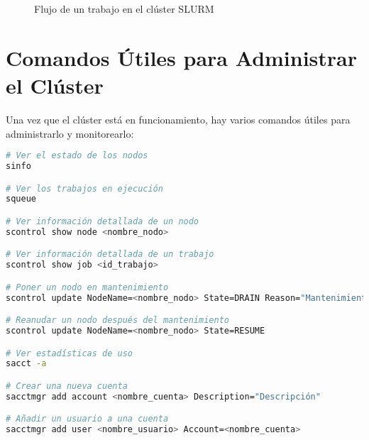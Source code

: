 \documentclass[12pt,a4paper]{article}
\begin{document}
\begin{figure}[h]
\centering
{}
\caption{Flujo de un trabajo en el clúster SLURM}
\end{figure}

\section{Comandos Útiles para Administrar el Clúster}

Una vez que el clúster está en funcionamiento, hay varios comandos útiles para administrarlo y monitorearlo:

\begin{lstlisting}[language=bash, caption=Comandos administrativos de SLURM]
# Ver el estado de los nodos
sinfo

# Ver los trabajos en ejecución
squeue

# Ver información detallada de un nodo
scontrol show node <nombre_nodo>

# Ver información detallada de un trabajo
scontrol show job <id_trabajo>

# Poner un nodo en mantenimiento
scontrol update NodeName=<nombre_nodo> State=DRAIN Reason="Mantenimiento"

# Reanudar un nodo después del mantenimiento
scontrol update NodeName=<nombre_nodo> State=RESUME

# Ver estadísticas de uso
sacct -a

# Crear una nueva cuenta
sacctmgr add account <nombre_cuenta> Description="Descripción"

# Añadir un usuario a una cuenta
sacctmgr add user <nombre_usuario> Account=<nombre_cuenta>
\end{lstlisting}
\end{document}
